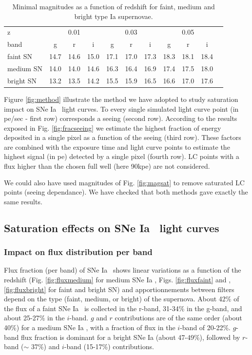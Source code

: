 \documentclass[\docopts]{\docclass}
\newcommand{\sne}{{SNe Ia }}
\begin{document}
\begin{table}[!htbp]
  \caption{Minimal magnitudes as a function of redshift for faint, medium and bright type Ia supernovae.}\label{tab:minimag}
  \begin{center}
    \begin{tabular}{l|ccc|ccc|cccc}
      \hline
      \hline
      z        &\multicolumn{3}{c}{0.01} & \multicolumn{3}{c}{0.03} & \multicolumn{3}{c}{0.05} \\
      band & g & r & i & g & r & i & g & r &i \\
      \hline
      \hline
      faint SN   & 14.7 & 14.6 & 15.0 & 17.1 & 17.0 & 17.3 & 18.3 & 18.1 & 18.4 \\
      medium SN  & 14.0 & 14.0 & 14.6 & 16.3 & 16.4 & 16.9 & 17.4 & 17.5 & 18.0 \\
      bright SN & 13.2 & 13.5 & 14.2 & 15.5 & 15.9 & 16.5 & 16.6 & 17.0 & 17.6\\
      \hline
    \end{tabular}
  \end{center}
  \end{table}

Figure \ref{fig:method} illustrate the method we have adopted to study saturation impact on \sne~light curves. To every single simulated light curve point (in pe/sec - first row) corresponds a seeing (second row). According to the results exposed in Fig. \ref{fig:fracseeing} we estimate the highest fraction of energy deposited in a single pixel as a function of the seeing (third row). These factors are combined with the exposure time and  light curve points to estimate the highest signal (in pe) detected by a single pixel (fourth row). LC points with a flux higher than the chosen full well (here 90kpe) are not considered.\par
We could also have used  magnitudes of Fig. \ref{fig:magsat} to remove saturated LC points (seeing dependance). We have checked that both methods gave exactly the same results. 

\subsection{Saturation effects on \sne~light curves}

\subsubsection{Impact on flux distribution per band}
Flux fraction (per band) of \sne~shows linear variations as a function of the redshift (Fig. \ref{fig:fluxmedium} for medium \sne, Figs. \ref{fig:fluxfaint} and ,\ref{fig:fluxbright} for faint and bright SN) and apportionnements between filters depend on the type (faint, medium, or bright) of the supernova. About 42\% of the flux of a faint \sne~is collected in the r-band, 31-34\% in the g-band, and about 25-27\%  in the $i$-band. $g$ and $r$ contributions are of the same order (about 40\%) for a medium \sne, with a fraction of flux in the $i$-band of 20-22\%.  $g$-band flux fraction is dominant for a bright \sne (about 47-49\%), followed by $r$-band ($\sim$ 37\%) and $i$-band (15-17\%) contributions.
\end{document}
